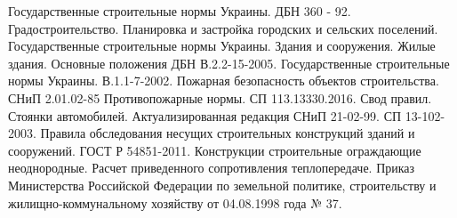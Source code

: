 \begin{thebibliography}{99}
Государственные строительные нормы Украины. ДБН 360 - 92. Градостроительство. Планировка и застройка городских и сельских поселений.  
Государственные строительные нормы Украины. Здания и сооружения. Жилые здания. Основные положения ДБН В.2.2-15-2005.  
Государственные строительные нормы Украины. В.1.1-7-2002. Пожарная безопасность объектов строительства.  
СНиП 2.01.02-85 Противопожарные нормы.  
СП 113.13330.2016. Свод правил. Стоянки автомобилей. Актуализированная редакция СНиП 21-02-99.  
СП 13-102-2003. Правила обследования несущих строительных конструкций зданий и сооружений.  
ГОСТ Р 54851-2011. Конструкции строительные ограждающие неоднородные. Расчет приведенного сопротивления теплопередаче.  
Приказ Министерства Российской Федерации по земельной политике, строительству и жилищно-коммунальному хозяйству от 04.08.1998 года № 37.  
\end{thebibliography}